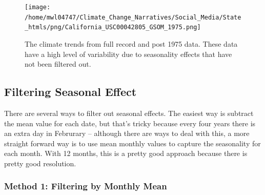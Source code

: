 \documentclass{article}
\begin{document}
\begin{itemize}
\begin{figure}
\texttt{[image: /home/mwl04747/Climate\_Change\_Narratives/Social\_Media/State\_htmls/png/California\_USC00042805\_GSOM\_1975.png]}
\caption{The climate trends from full record and post 1975 data. These data have a high level of variability due to seasonality effects that have not been filtered out.}
\label{fig:GSOM-1975trend}
\end{figure}


\subsection{Filtering Seasonal Effect}

There are several ways to filter out seasonal effects. The easiest way is subtract the mean value for each date, but that's tricky because every four years there is an extra day in Februrary -- although there are ways to deal with this, a more straight forward way is to use mean monthly values to capture the seasonality for each month. With 12 months, this is a pretty good approach because there is pretty good resolution. 

\subsubsection{Method 1: Filtering by Monthly Mean} 

\begin{knitrout}
\color{fgcolor}\begin{kframe}


{\ttfamily\noindent\bfseries\color{errorcolor}{\#\# Error in eval(m\$data, parent.frame()): object 'GSOM' not found}}

{\ttfamily\noindent\bfseries{}}

{\ttfamily\noindent\bfseries\color{errorcolor}{\#\# Error in h(simpleError(msg, call)): error in evaluating the argument 'x' in selecting a method for function 'merge': object 'GSOM' not found}}

{\ttfamily\noindent\bfseries\color{errorcolor}{\#\# Error in eval(expr, envir, enclos): object 'GSOM2' not found}}

{\ttfamily\noindent\bfseries\color{errorcolor}{\#\# Error in eval(m\$data, parent.frame()): object 'GSOM' not found}}

{\ttfamily\noindent\bfseries{}}


\end{kframe}
\end{knitrout}
\end{itemize}
\end{document}
